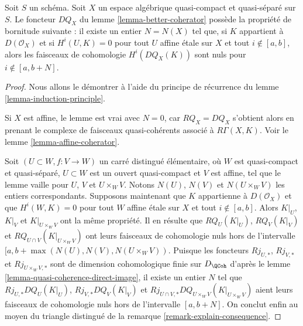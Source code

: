 \begin{lemma}
\label{lemma-boundedness-better-coherator}
Soit $S$ un schéma.
Soit $X$ un espace algébrique quasi-compact et quasi-séparé sur $S$.
Le foncteur $DQ_X$ du lemme \ref{lemma-better-coherator}
possède la propriété de bornitude suivante :
il existe un entier $N = N(X)$ tel que, si
$K$ appartient à $D(\mathcal{O}_X)$ et si
$H^i(U, K) = 0$ pour tout $U$ affine étale sur $X$ et tout $i \not \in [a, b]$, alors
les faisceaux de cohomologie $H^i(DQ_X(K))$ sont nuls pour
$i \not \in [a, b + N]$.
\end{lemma}

\begin{proof}
Nous allons le démontrer à l'aide du principe de récurrence du
lemme \ref{lemma-induction-principle}.

\medskip\noindent
Si $X$ est affine, le lemme est vrai avec $N = 0$, car
$RQ_X = DQ_X$ s'obtient alors en prenant le complexe de
faisceaux quasi-cohérents associé à $R\Gamma(X, K)$.
Voir le lemme \ref{lemma-affine-coherator}.

\medskip\noindent
Soit $(U \subset W, f : V \to W)$ un carré distingué élémentaire,
où $W$ est quasi-compact et quasi-séparé, $U \subset W$
est un ouvert quasi-compact et $V$ est affine, tel que
le lemme vaille pour $U$, $V$ et $U \times_W V$.
Notons $N(U)$, $N(V)$ et $N(U \times_W V)$ les entiers correspondants.
Supposons maintenant que $K$ appartienne à $D(\mathcal{O}_X)$ et que
$H^i(W, K) = 0$ pour tout $W$ affine étale sur $X$ et tout $i \not \in [a, b]$.
Alors $K|_U$, $K|_V$ et $K|_{U \times_W V}$ ont la même propriété.
Il en résulte que $RQ_U(K|_U)$, $RQ_V(K|_V)$ et
$RQ_{U \cap V}(K|_{U \times_W V})$ ont leurs faisceaux de cohomologie nuls
hors de l'intervalle $[a, b + \max(N(U), N(V), N(U \times_W V))$.
Puisque les foncteurs $Rj_{U, *}$, $Rj_{V, *}$ et $Rj_{U \times_W V, *}$
sont de dimension cohomologique finie sur $D_\QCoh$ d'après le
lemme \ref{lemma-quasi-coherence-direct-image},
il existe un entier $N$ tel que
$Rj_{U, *}DQ_U(K|_U)$, $Rj_{V, *}DQ_V(K|_V)$ et
$Rj_{U \cap V, *}DQ_{U \times_W V}(K|_{U \times_W V})$ aient leurs
faisceaux de cohomologie nuls hors de l'intervalle $[a, b + N]$.
On conclut enfin au moyen du triangle distingué de la
remarque \ref{remark-explain-consequence}.
\end{proof}


